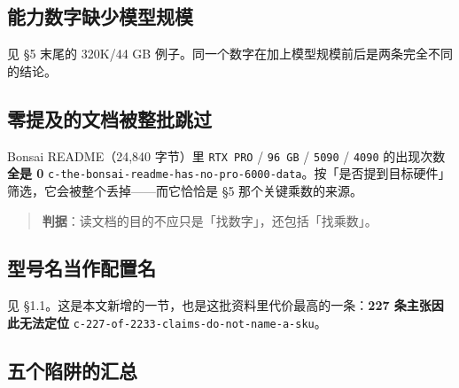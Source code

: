 \subsection{能力数字缺少模型规模}

见 §5 末尾的 320K/44 GB 例子。同一个数字在加上模型规模前后是两条完全不同的结论。


\subsection{零提及的文档被整批跳过}

Bonsai README（24,840 字节）里 \texttt{RTX PRO} / \texttt{96 GB} / \texttt{5090} / \texttt{4090} 的出现次数\textbf{全是 0} {\scriptsize\texttt{c-\hspace{0pt}the-\hspace{0pt}bonsai-\hspace{0pt}readme-\hspace{0pt}has-\hspace{0pt}no-\hspace{0pt}pro-\hspace{0pt}6000-\hspace{0pt}data}}。按「是否提到目标硬件」筛选，它会被整个丢掉——而它恰恰是 §5 那个关键乘数的来源。


\begin{quote}\small
\textbf{判据}：读文档的目的不应只是「找数字」，还包括「找乘数」。

\end{quote}

\subsection{型号名当作配置名}

见 §1.1。这是本文新增的一节，也是这批资料里代价最高的一条：\textbf{227 条主张因此无法定位} {\scriptsize\texttt{c-\hspace{0pt}227-\hspace{0pt}of-\hspace{0pt}2233-\hspace{0pt}claims-\hspace{0pt}do-\hspace{0pt}not-\hspace{0pt}name-\hspace{0pt}a-\hspace{0pt}sku}}。



\subsection{五个陷阱的汇总}

